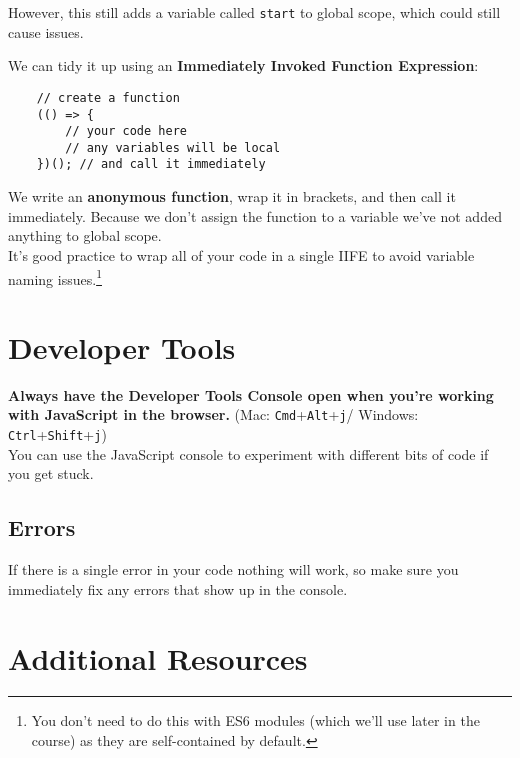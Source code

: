 However, this still adds a variable called \texttt{start} to global scope, which could still cause issues.

\pagebreak

We can tidy it up using an \textbf{Immediately Invoked Function Expression}:

\begin{verbatim}
    // create a function
    (() => {
        // your code here
        // any variables will be local
    })(); // and call it immediately
\end{verbatim}

We write an \textbf{anonymous function}, wrap it in brackets, and then call it immediately. Because we don't assign the function to a variable we've not added anything to global scope.
\\

It's good practice to wrap all of your code in a single IIFE to avoid variable naming issues.\footnote{You don't need to do this with ES6 modules (which we'll use later in the course) as they are self-contained by default.}



\section{Developer Tools}

\textbf{Always have the Developer Tools Console open when you're working with JavaScript in the browser.} (Mac: \texttt{Cmd}+\texttt{Alt}+\texttt{j}/ Windows: \texttt{Ctrl}+\texttt{Shift}+\texttt{j})
\\

You can use the JavaScript console to experiment with different bits of code if you get stuck.

\subsection{Errors}

If there is a single error in your code nothing will work, so make sure you immediately fix any errors that show up in the console.


\pagebreak

\section{Additional Resources}


